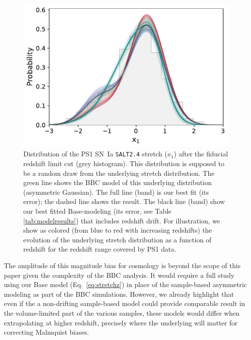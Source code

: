 \documentclass[]{aa} %
\newcommand{\mr}[1]{{\textcolor[rgb]{0.60,0.10,0.6}{#1}}}
\begin{document}
\begin{figure}
    \centering
    \includegraphics[width=\linewidth]{Article_figures/bbc_comp_PS1_hist-nr.pdf}
    \caption{Distribution of the PS1 SN~Ia \textsc{\texttt{SALT2.4}} stretch
        ($x_1$) after the fiducial redshift limit cut (grey histogram). This
        distribution is supposed to be a random draw from the underlying stretch
        distribution. The green line shows the BBC model of this underlying
        distribution (asymmetric Gaussian). The full line (band) is our best fit
        (its error); the dashed line shows the \cite{scolnic2018a} result. The
        black line (band) show our best fitted Base-modeling (its error, see
        Table \ref{tab:modelresults}) that includes redshift drift. For
        illustration, we show as colored (from blue to red with increasing
        redshifts) the evolution of the underlying stretch distribution as a
        function of redshift for the redshift range covered by PS1 data.}
    \label{fig:bbc_pdf_ps1}
\end{figure}


The amplitude of this magnitude bias for cosmology is beyond the scope of this
paper given the complexity of the BBC analysis. It would require a full study
using our Base model (Eq.~\ref{eq:stretchz}) in place of the sample-based
asymmetric modeling as part of the BBC simulations. 
\mr{However, we already highlight that even if the a non-drifting sample-based model could provide comparable result in the volume-limited part of the various samples, these models would differ when extrapolating at higher redshift, precisely where the  underlying will matter for correcting Malmquist biases.}
\end{document}
